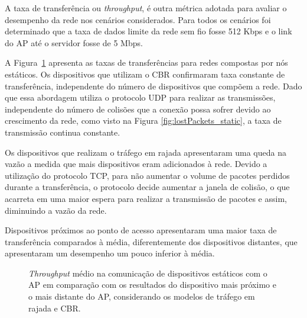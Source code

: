 \documentclass[12pt]{article}
\begin{document}
A taxa de transferência ou \textit{throughput}, é outra métrica adotada para avaliar o desempenho da rede nos cenários considerados. Para todos os cenários foi determinado que a taxa de dados limite da rede sem fio fosse 512 Kbps e o link do AP até o servidor fosse de 5 Mbps.

A Figura~\ref{fig:throughput_static} apresenta as taxas de transferências para redes compostas por nós estáticos. Os dispositivos que utilizam o CBR confirmaram taxa constante de transferência, independente do número de dispositivos que compõem a rede. Dado que essa abordagem utiliza o protocolo UDP para realizar as transmissões, independente do número de colisões que a conexão possa sofrer devido ao crescimento da rede, como visto na Figura \ref{fig:lostPackets_static}, a taxa de transmissão continua constante.

Os dispositivos que realizam o tráfego em rajada apresentaram uma queda na vazão a medida que mais dispositivos eram adicionados à rede. Devido a utilização do protocolo TCP, para não aumentar o volume de pacotes perdidos durante a transferência, o protocolo decide aumentar a janela de colisão, o que acarreta em uma maior espera para realizar a transmissão de pacotes e assim, diminuindo a vazão da rede.

Dispositivos próximos ao ponto de acesso apresentaram uma maior taxa de transferência comparados à média, diferentemente dos dispositivos distantes, que apresentaram um desempenho um pouco inferior à média.

\begin{figure}[H]
\begin{center}
{%
\setlength{\fboxsep}{2pt}%
\setlength{\fboxrule}{1pt}%
%
}
\end{center}
\caption{\textit{Throughput} médio na comunicação de dispositivos estáticos com o AP em comparação com os resultados do dispositivo mais próximo e o mais distante do AP, considerando os modelos de tráfego em rajada e CBR.}
\label{fig:throughput_static}
\end{figure}
 
\end{document}
